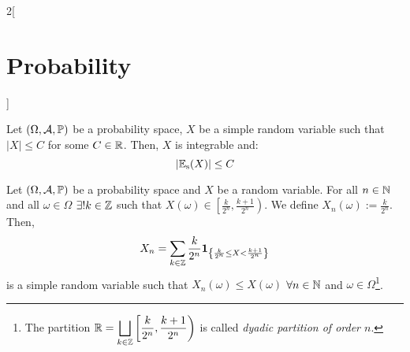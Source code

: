 \documentclass[../../../main.tex]{subfiles}
\begin{document}
\begin{multicols}{2}[\section{Probability}]
\begin{proposition}
  \end{proposition}
  \begin{proposition}
    Let $(\Omega,\mathcal{A},\mathbb{P})$ be a probability space, $X$ be a simple random variable such that $|X|\leq C$ for some $C\in\mathbb{R}$. Then, $X$ is integrable and: $$|\mathbb{E}_\text{s}(X)|\leq C$$
  \end{proposition}
  \begin{proposition}
    Let $(\Omega,\mathcal{A},\mathbb{P})$ be a probability space and $X$ be a random variable. For all $n\in\mathbb{N}$ and all $\omega\in\Omega$ $\exists! k\in\mathbb{Z}$ such that $X(\omega)\in\left[\frac{k}{2^n},\frac{k+1}{2^n}\right)$. We define $X_n(\omega):=\frac{k}{2^n}$. Then, $$X_n=\sum_{k\in\mathbb{Z}}\frac{k}{2^n}\boldsymbol{\mathrm{1}}_{\left\{\frac{k}{2^n}\leq X< \frac{k+1}{2^n}\right\}}$$ is a simple random variable such that $X_n(\omega)\leq X(\omega)$ $\forall n\in\mathbb{N}$ and $\omega\in \Omega$\footnote{The partition $\displaystyle\mathbb{R}=\bigsqcup_{k\in\mathbb{Z}}\left[\frac{k}{2^n},\frac{k+1}{2^n}\right)$ is called \emph{dyadic partition of order $n$}.}.
  \end{proposition}

\end{multicols}
\end{document}
